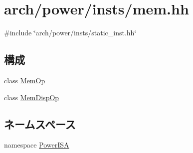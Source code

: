 \hypertarget{power_2insts_2mem_8hh}{
\section{arch/power/insts/mem.hh}
\label{power_2insts_2mem_8hh}
}
{\ttfamily \#include \char`\"{}arch/power/insts/static\_\-inst.hh\char`\"{}}\par
\subsection*{構成}
\begin{DoxyCompactItemize}
\item 
class \hyperlink{classPowerISA_1_1MemOp}{MemOp}
\item 
class \hyperlink{classPowerISA_1_1MemDispOp}{MemDispOp}
\end{DoxyCompactItemize}
\subsection*{ネームスペース}
\begin{DoxyCompactItemize}
\item 
namespace \hyperlink{namespacePowerISA}{PowerISA}
\end{DoxyCompactItemize}
